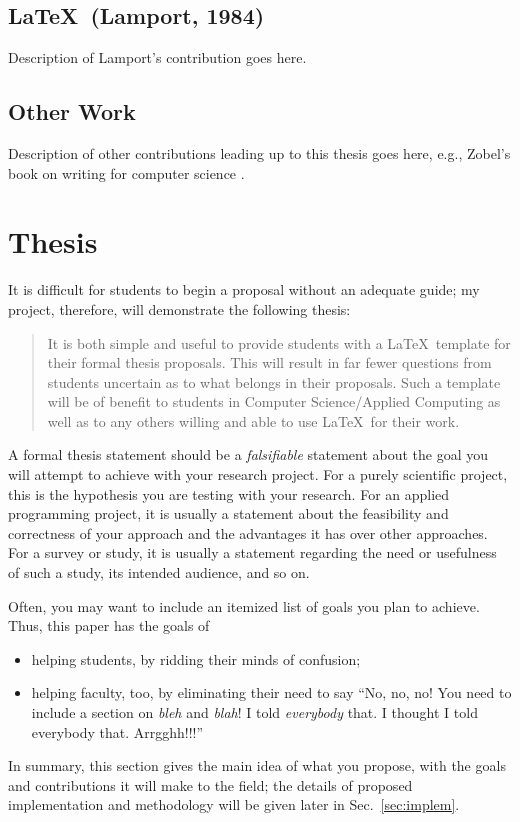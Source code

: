 \documentclass[11pt]{article}
\begin{document}
\subsection{\LaTeX\ (Lamport, 1984)}
Description of Lamport's contribution \cite{lamport:94} goes here.

\subsection{Other Work}
Description of other contributions leading up to this thesis goes here,
e.g., Zobel's book on writing for computer science \cite{zobel:97}.

\section{Thesis}

It is difficult for students to begin a proposal without an adequate guide;
my project, therefore, will demonstrate the following thesis:
\singlespace
\begin{quote}
It is both simple and useful to provide students with a \LaTeX\ template
for their formal thesis proposals.  This will result in far fewer
questions from students uncertain as to what belongs in their proposals.
Such a template will be of benefit to students in Computer
Science/Applied Computing as well as to any others willing and able
to use \LaTeX\ for their work.
\end{quote}
\doublespace

A formal thesis statement should be a \emph{falsifiable} statement about
the goal you will attempt to achieve with your research project.
For a purely scientific project, this is the hypothesis you are testing
with your research.  For an applied programming project, it is usually a
statement about the feasibility and correctness of your approach and
the advantages it has over other approaches.  For a survey or study,
it is usually a statement regarding the need or usefulness of such
a study, its intended audience, and so on.

Often, you may want to include an itemized list of goals you plan to
achieve.  Thus, this paper has the goals of
\begin{itemize}
\item
helping students, by ridding their minds of confusion;
\item
helping faculty, too, by eliminating their need to say ``No, no, no!
You need to include a section on \emph{bleh} and \emph{blah}!
I told \emph{everybody} that.  I thought I told everybody that.  Arrgghh!!!''
\end{itemize}
In summary, this section gives the main idea of what you propose,
with the goals and contributions it will make to the field; the
details of proposed implementation and methodology will be given later
in Sec.~\ref{sec:implem}.
\end{document}
